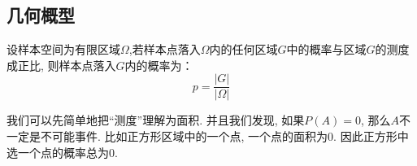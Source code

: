 \subsection{几何概型}

\begin{definition}
    设样本空间为有限区域$\Omega$,若样本点落入$\Omega$内的任何区域$G$中的概率与区域$G$的测度成正比, 则样本点落入$G$内的概率为：
    $$
        p=\frac{\vert G\vert}{\vert \Omega \vert}
    $$
\end{definition}

我们可以先简单地把``测度''理解为面积. 并且我们发现, 如果$P(A)=0$, 那么$A$不一定是不可能事件. 比如正方形区域中的一个点, 一个点的面积为0. 因此正方形中选一个点的概率总为0. 





